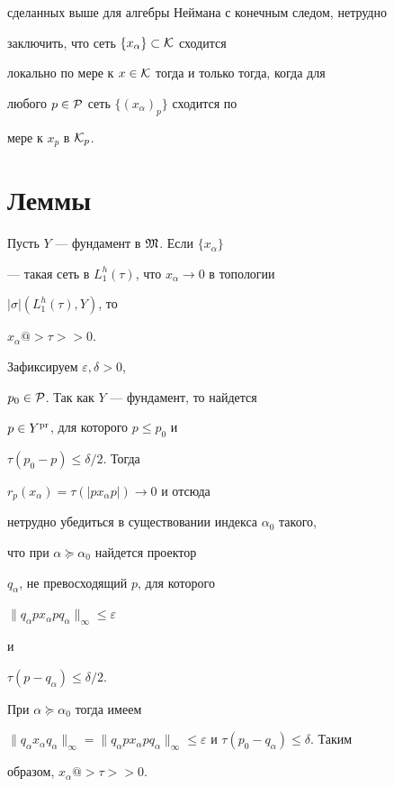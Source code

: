 сделанных выше для алгебры Неймана с конечным следом, нетрудно 


заключить, что сеть $\{x_{\alpha}\} \subset {\cal K}$ сходится 


локально по мере к $x \in {\cal K}$ тогда и только тогда, когда для 


любого $p \in {\cal P}$ сеть $\{(x_{\alpha})_p\}$ сходится по 


мере к $x_p$ в ${\cal K}_p$. 





\section{Леммы}





\begin{lem}


Пусть $Y$ --- фундамент в $\frak M$. Если $\{x_{\alpha}\}$ 


--- такая сеть в $L_1^h (\tau)$, что $x_{\alpha} \to 0$ в топологии 


$| \sigma |(L_1^h (\tau), Y)$, то 


$x_{\alpha}@>{\tau}>> 0$.


\end{lem}





\begin{pf}


Зафиксируем $\varepsilon, \delta > 0$, 


$p_0 \in {\cal P}$. Так как $Y$ --- фундамент, то найдется 


$p \in Y^{\operatorname{pr}}$, для которого $p \le p_0$ и 


$\tau (p_0 - p) \le \delta /2$. Тогда 


$r_p (x_{\alpha})=\tau (|p x_{\alpha} p|) \to 0$ и отсюда 


нетрудно убедиться в существовании индекса ${\alpha}_0$ такого, 


что при ${\alpha} \succeq {\alpha}_0$ найдется проектор


$q_{\alpha}$, не превосходящий $p$, для которого 


$\| q_{\alpha} p x_{\alpha} p q_{\alpha} \|_{\infty} \le \varepsilon $


и


$\tau (p - q_{\alpha}) \le \delta /2$. 


При ${\alpha} \succeq {\alpha}_0$ тогда имеем


$ \| q_{\alpha} x_{\alpha} q_{\alpha} \|_{\infty}=


\| q_{\alpha} p x_{\alpha} p q_{\alpha} \|_{\infty} 


\le \varepsilon $ и $\tau (p_0 - q_{\alpha}) \le \delta $. Таким 


образом, $x_{\alpha}@>{\tau}>> 0$.


\end{pf}





